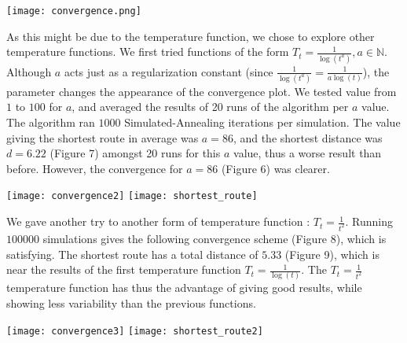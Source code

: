\documentclass{article}
\newcommand{\N}{\mathbb N}
\begin{document}
\begin{center}
    \texttt{[image: convergence.png]}
\end{center}

As this might be due to the temperature function, we chose to explore other 
temperature functions. We first tried functions of the form $T_t = \frac{1}{\log(t^a)}, a \in \N$.
Although $a$ acts just as a regularization constant 
(since $\frac{1}{\log(t^a)} = \frac{1}{a\log(t)}$), the parameter changes the appearance
of the convergence plot. We tested value from $1$ to $100$ for $a$, and averaged the results of 
20 runs of the algorithm per $a$ value. The algorithm ran $1000$ Simulated-Annealing
iterations per simulation. The value giving the shortest route in 
average was $a=86$, and the shortest distance was $d=6.22$ (Figure 7) amongst 
20 runs for this $a$ value, thus a worse result than before. However, the convergence for 
$a=86$ (Figure 6) was clearer. 


\begin{center}
    \begin{multicols}{2}
        \texttt{[image: convergence2]} \vspace{0.5cm}
        \texttt{[image: shortest\_route]}
    \end{multicols}
\end{center}

We gave another try to another form of temperature function : 
$T_t = \frac{1}{t^2}$. Running $100000$ simulations gives the following convergence
scheme (Figure 8), which is satisfying. The shortest route has a total 
distance of $5.33$ (Figure 9), which is near the results of the first temperature function 
$T_t = \frac{1}{\log(t)}$. The $T_t = \frac{1}{t^2}$ temperature function has thus the advantage 
of giving good results, while showing less variability than the previous functions.


\begin{center}
    \begin{multicols}{2}
        \texttt{[image: convergence3]} \vspace{0.5cm}
        \texttt{[image: shortest\_route2]}
    \end{multicols}
\end{center}
\end{document}
